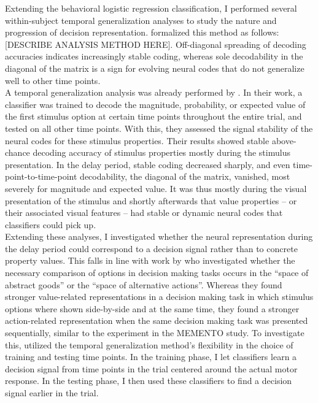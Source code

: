 Extending the behavioral logistic regression classification, I performed several within-subject temporal generalization analyses to study the nature and progression of decision representation.
\citet{king2014characterizing} formalized this method as follows:
[DESCRIBE ANALYSIS METHOD HERE].
Off-diagonal spreading of decoding accuracies indicates increasingly stable coding, whereas sole decodability in the diagonal of the matrix is a sign for evolving neural codes that do not generalize well to other time points.\\
A temporal generalization analysis was already performed by \citet{kaiserposter}.
In their work, a classifier was trained to decode the magnitude, probability, or expected value of the first stimulus option at certain time points throughout the entire trial, and tested on all other time points.
With this, they assessed the signal stability of the neural codes for these stimulus properties.
Their results showed stable above-chance decoding accuracy of stimulus properties mostly during the stimulus presentation.
In the delay period, stable coding decreased sharply, and even time-point-to-time-point decodability, the diagonal of the matrix, vanished, most severely for magnitude and expected value.
It was thus mostly during the visual presentation of the stimulus and shortly afterwards that value properties -- or their associated visual features -- had stable or dynamic neural codes that classifiers could pick up.\\
Extending these analyses, I investigated whether the neural representation during the delay period could correspond to a decision signal rather than to concrete property values.
This falls in line with work by \citet{hunt2013trial} who investigated whether the necessary comparison of options in decision making tasks occurs in the ``space of abstract goods'' or the ``space of alternative actions''.
Whereas they found stronger value-related representations in a decision making task in which stimulus options where shown side-by-side and at the same time, they found a stronger action-related representation when the same decision making task was presented sequentially, similar to the experiment in the MEMENTO study.
To investigate this, utilized the temporal generalization method's flexibility in the choice of training and testing time points.
In the training phase, I let classifiers learn a decision signal from time points in the trial centered around the actual motor response.
In the testing phase, I then used these classifiers to find a decision signal earlier in the trial.
